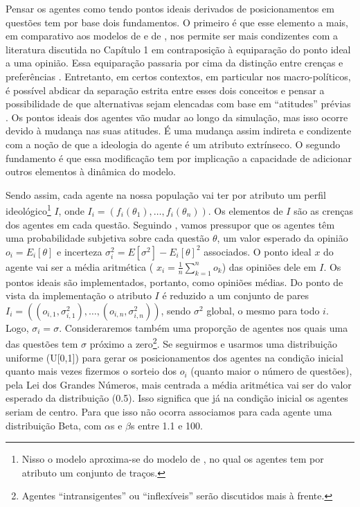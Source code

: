 Pensar os agentes como tendo pontos ideais derivados de posicionamentos em
questões tem por base dois fundamentos. O primeiro é que esse elemento a mais,
em comparativo aos modelos de  e de
, nos permite ser mais condizentes com a
literatura discutida no Capítulo 1 em contraposição à equiparação do ponto ideal
a uma opinião. Essa equiparação passaria por cima da distinção entre crenças e
preferências \cite{list2009judgment}. Entretanto, em certos contextos, em
particular nos macro-políticos, é possível abdicar da separação estrita entre
esses dois conceitos e pensar a possibilidade de que alternativas sejam
elencadas com base em ``atitudes'' prévias
\cite{binmore2008rational,laver2014measuring}. Os pontos ideais dos
agentes vão mudar ao longo da simulação, mas isso ocorre devido à mudança nas
suas atitudes. É uma mudança assim indireta e condizente com a noção de que a
ideologia do agente é um atributo extrínseco. O segundo fundamento é que essa
modificação tem por implicação a capacidade de adicionar outros elementos à
dinâmica do modelo.

Sendo assim, cada agente na nossa população vai ter por atributo um perfil
ideológico\footnote{Nisso o modelo aproxima-se do modelo de
  , no qual os agentes tem por atributo um
  conjunto de traços.} \(I\), onde \(I_i = (f_i(\theta_1), \ldots, f_i(\theta_n)) \). Os
elementos de \(I\) são as crenças dos agentes em cada questão. Seguindo
, vamos pressupor que os agentes têm uma
probabilidade subjetiva sobre cada questão \(\theta\), um valor esperado da opinião
\( o_i = E_i[\theta]\) e incerteza \( \sigma_i^2 = E[\sigma^2] - E_ i[\theta]^2\) associados. O
ponto ideal \(x\) do agente vai ser a média aritmética ( \(x_i =
\frac{1}{n}\sum_{k=1}^{n} o_k\)) das opiniões dele em \(I\). Os pontos ideais são
implementados, portanto, como opiniões médias. Do ponto de vista da
implementação o atributo \(I\) é reduzido a um conjunto de pares \(I_i =
((o_{i,1},\sigma_{i,1}^2), \ldots, (o_{i,n}, \sigma_{i,n}^2) )\), sendo \(\sigma^2\) global, o mesmo
para todo \(i\). Logo, \(\sigma_i = \sigma\). Consideraremos também uma proporção de
agentes nos quais uma das questões tem \(\sigma\) próximo a zero\footnote{Agentes
  ``intransigentes'' ou ``inflexíveis'' serão discutidos mais à frente.}. Se
seguirmos  e usarmos uma distribuição uniforme
(U[0,1]) para gerar os posicionamentos dos agentes na condição inicial quanto
mais vezes fizermos o sorteio dos \(o_i\) (quanto maior o número de questões),
pela Lei dos Grandes Números, mais centrada a média aritmética vai ser do valor
esperado da distribuição (0.5). Isso significa que já na condição inicial os
agentes seriam de centro. Para que isso não ocorra associamos para cada agente
uma distribuição Beta, com \(\alpha\)s e \(\beta\)s entre 1.1 e 100.

